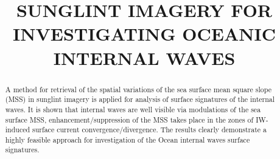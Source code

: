 \documentclass[draft,grl]{agutex}
\begin{document}
%
%


\title{SUNGLINT IMAGERY FOR INVESTIGATING OCEANIC INTERNAL WAVES}

%
%





%
%

\begin{abstract}

A method for retrieval of the spatial variations of the sea surface mean square slope (MSS) in sunglint imagery is applied for analysis of surface signatures of the internal waves. It is shown that internal waves are well visible via modulations of the sea surface MSS, enhancement/suppression of the MSS takes place in the zones of IW-induced surface current convergence/divergence. The results clearly demonstrate a highly feasible approach for investigation of the Ocean internal waves surface signatures.

\end{abstract}

%
%
\end{document}
